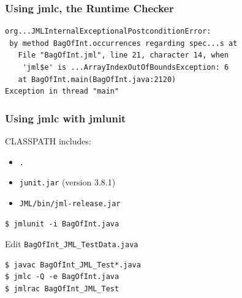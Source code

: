 \begin{frame}[fragile]
\frametitle{Using jmlc, the Runtime Checker}

{\small
\begin{verbatim}
org...JMLInternalExceptionalPostconditionError:
 by method BagOfInt.occurrences regarding spec...s at
   File "BagOfInt.jml", line 21, character 14, when
    'jml$e' is ...ArrayIndexOutOfBoundsException: 6
   at BagOfInt.main(BagOfInt.java:2120)
Exception in thread "main" 
\end{verbatim}
}

\end{frame}

\begin{frame}[fragile]
\frametitle{Using jmlc with jmlunit}

\begin{example}
CLASSPATH includes:
\begin{itemize}
\item
\texttt{.}

\item
\texttt{junit.jar} (version 3.8.1)

\item
\texttt{JML/bin/jml-release.jar}
\end{itemize}

\begin{verbatim}
$ jmlunit -i BagOfInt.java
\end{verbatim}

Edit \lstinline!BagOfInt_JML_TestData.java!

\begin{verbatim}
$ javac BagOfInt_JML_Test*.java
$ jmlc -Q -e BagOfInt.java
$ jmlrac BagOfInt_JML_Test
\end{verbatim}
\end{example}
\end{frame}

